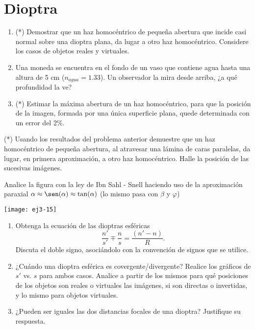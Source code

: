 \section*{Dioptra}

\item 
\begin{enumerate}
	\item (*) Demostrar que un haz homocéntrico de pequeña abertura que incide casi normal sobre una dioptra plana, da lugar a otro haz homocéntrico.
	Considere los casos de objetos reales y virtuales.
	\item Una moneda se encuentra en el fondo de un vaso que contiene agua hasta una altura de 5 cm ($n_{agua}=1.33$).
	Un observador la mira desde arriba, ¿a qué profundidad la ve?
	\item (*) Estimar la máxima abertura de un haz homocéntrico, para que la posición de la imagen, formada por una única superficie plana, quede determinada con un error del 2\%. 
\end{enumerate}


\item (*) Usando los resultados del problema anterior demuestre que un haz homocéntrico de pequeña abertura, al atravesar una lámina de caras paralelas, da lugar, en primera aproximación, a otro haz homocéntrico.
Halle la posición de las sucesivas imágenes. 


\item
\begin{minipage}[t][1.4cm]{0.55\textwidth}
	Analice la figura con la ley de Ibn Sahl - Snell haciendo uso de la aproximación paraxial $\alpha \approx \sen( \alpha ) \approx \tan( \alpha )$ (lo mismo pasa con $\beta$ y $\varphi$) 
\end{minipage}
\begin{minipage}[c][0.4cm][t]{0.4\textwidth}
	\texttt{[image: ej3-15]}
\end{minipage}
\begin{enumerate}
	\item
	Obtenga la ecuación de las dioptras esféricas
	\[
		\frac{n'}{s'}\mp\frac{n}{s}=\frac{(n'-n)}{R} .
	\]
	Discuta el doble signo, asociándolo con la convención de signos que se utilice.
	\item ¿Cuándo una dioptra esférica es covergente/divergente? 
	Realice los gráficos de $s'$ vs. $s$ para ambos casos.
	Analice a partir de los mismos para qué posiciones de los objetos son reales o virtuales las imágenes, si son directas o invertidas, y lo mismo para objetos virtuales.
	\item ¿Pueden ser iguales las dos distancias focales de una dioptra?
	Justifique su respuesta.
\end{enumerate}
